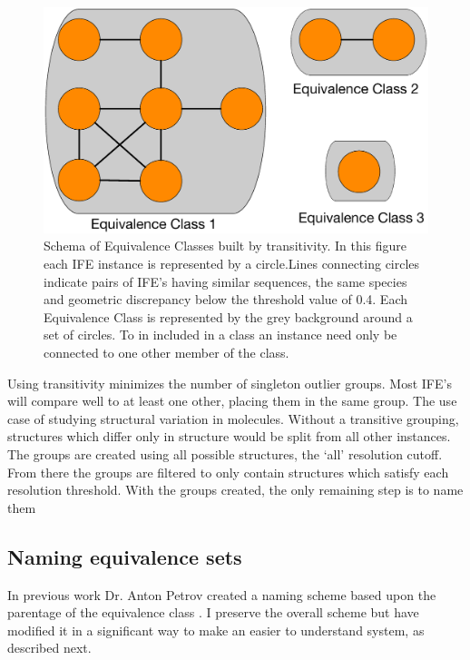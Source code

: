 \begin{figure}[ht]
  \includegraphics[width=\linewidth]{chapter-3/figs/ife-transtivity}
  \caption{Schema of Equivalence Classes built by transitivity. In this figure
    each IFE instance is represented by a circle.Lines connecting circles
    indicate pairs of IFE's having similar sequences, the same species and
    geometric discrepancy below the threshold value of 0.4. Each Equivalence
  Class is represented by the grey background around a set of circles. To in
included in a class an instance need only be connected to one other member of
the class.}
  \label{fig:transitivity}
\end{figure}

Using transitivity minimizes the number of singleton outlier groups. Most IFE’s
will compare well to at least one other, placing them in the same group. The use
case of studying structural variation in molecules. Without a transitive
grouping, structures which differ only in structure would be split from all
other instances. The groups are created using all possible structures, the ‘all’
resolution cutoff. From there the groups are filtered to only contain structures
which satisfy each resolution threshold. With the groups created, the only
remaining step is to name them

\subsection{Naming equivalence sets}

In previous work Dr. Anton Petrov created a naming scheme based upon the
parentage of the equivalence class \cite{Petrov2013}. I preserve the overall
scheme but have modified it in a significant way to make an easier to understand
system, as described next.

